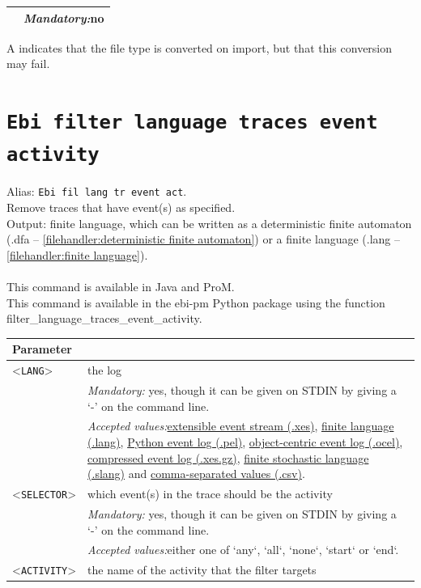 {\begin{tabularx}{\linewidth}{lX}
&\textit{Mandatory:}\quad no\\
\bottomrule
\end{tabularx}
A \textdagger{} indicates that the file type is converted on import, but that this conversion may fail.
\clearpage\section{\texttt{Ebi filter language traces event activity}}
\label{command:Ebi filter language traces event activity}
Alias: \texttt{Ebi fil lang tr event act}.\\
Remove traces that have event(s) as specified.\\
\noindent Output: finite language, which can be written as a deterministic finite automaton (.dfa -- \cref{filehandler:deterministic finite automaton}) or a finite language (.lang -- \cref{filehandler:finite language}).\\
\\This command is available in Java and ProM.
\\This command is available in the ebi-pm Python package using the function filter\_language\_traces\_event\_activity.
\begin{tabularx}{\linewidth}{lX}
\toprule
Parameter \\\midrule
<\texttt{LANG}>&the log\\
&\textit{Mandatory:} \quad yes, though it can be given on STDIN by giving a `-' on the command line.\\
&\textit{Accepted values:}\quad \hyperref[filehandler:extensible event stream]{extensible event stream (.xes)}, \hyperref[filehandler:finite language]{finite language (.lang)}, \hyperref[filehandler:Python event log]{Python event log (.pel)}, \hyperref[filehandler:object-centric event log]{object-centric event log (.ocel)}, \hyperref[filehandler:compressed event log]{compressed event log (.xes.gz)}, \hyperref[filehandler:finite stochastic language]{finite stochastic language (.slang)} and \hyperref[filehandler:comma-separated values]{comma-separated values (.csv)}.\\
<\texttt{SELECTOR}>&which event(s) in the trace should be the activity\\
&\textit{Mandatory:} \quad yes, though it can be given on STDIN by giving a `-' on the command line.\\
&\textit{Accepted values:}\quad either one of `any`, `all`, `none`, `start` or `end`.\\
<\texttt{ACTIVITY}>&the name of the activity that the filter targets\\

\end{tabularx}}
